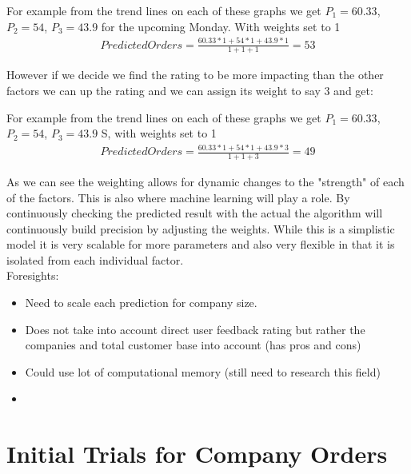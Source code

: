 \documentclass[12pt]{article}
\newcommand{\ban}[1]{ \begin{align*}#1\end{align*} }
\begin{document}
For example from the trend lines on each of these graphs we get $P_1=60.33$, $P_2=54$, $P_3=43.9$ for the upcoming Monday. With weights set to 1
\ban{
Predicted Orders = \frac{60.33*1+54*1+43.9*1}{1+1+1}=53
}

However if we decide we find the rating to be more impacting than the other factors we can up the rating and we can assign its weight to say 3 and get:

For example from the trend lines on each of these graphs we get $P_1=60.33$, $P_2=54$, $P_3=43.9$ S, with weights set to 1
\ban{
Predicted Orders = \frac{60.33*1+54*1+43.9*3}{1+1+3}=49
}

As we can see the weighting allows for dynamic changes to the "strength" of each of the factors. This is also where machine learning will play a role. By continuously checking the predicted result with the actual the algorithm will  continuously build precision by adjusting the weights. While this is a simplistic model it is very scalable for more parameters and also very flexible in that it is isolated from each individual factor.\\

Foresights:
\begin{itemize}
  \item Need to scale each prediction for company size.
  \item Does not take into account direct user feedback rating but rather the companies and total customer base into account (has pros and cons)
  \item Could use lot of computational memory (still need to research this field)
  \item 
\end{itemize}
\vspace{0.25cm}

\section{Initial Trials for Company Orders}
\end{document}
